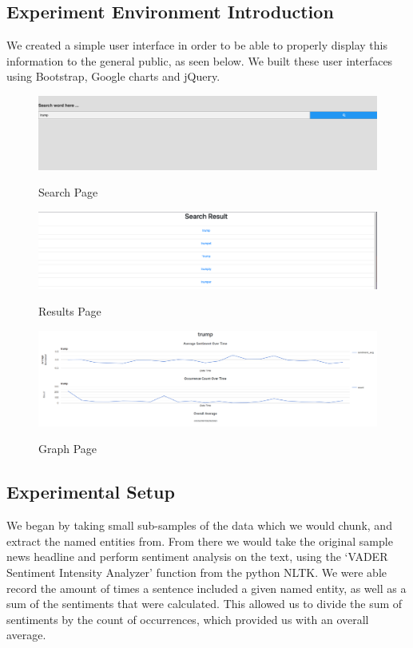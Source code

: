 \documentclass[12pt]{article}
\begin{document}
\subsection{Experiment Environment Introduction}

We created a simple user interface in order to be able to properly display this information to the general public, as seen below. We built these user interfaces using Bootstrap\cite{Bootstrap}, Google charts\cite{GoogleChart} and jQuery\cite{jQuery}.

\begin{figure}[htp]
    \centering
    \includegraphics[scale=0.25]{main.PNG} \\
    \caption{Search Page}
\end{figure}


\begin{figure}[htp]
    \centering
    \includegraphics[scale=0.25]{list.PNG} \\
     \caption{Results Page}
\end{figure}


\begin{figure}[htp]
    \centering
    \includegraphics[scale=0.25]{trump.PNG} \\
    \caption{Graph Page}
\end{figure}


\subsection{Experimental Setup}
\hspace{\parindent}  We began by taking small sub-samples of the data which we would chunk, and extract the named entities from. From there we would take the original sample news headline and perform sentiment analysis on the text, using the `VADER Sentiment Intensity Analyzer' function from the python NLTK\@. We were able record the amount of times a sentence included a given named entity, as well as a sum of the sentiments that were calculated. This allowed us to divide the sum of sentiments by the count of occurrences, which provided us with an overall average.
\end{document}
